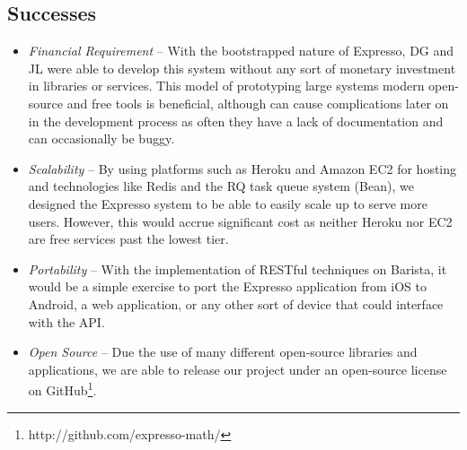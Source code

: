 \documentclass{acm_proc_article-sp}
\begin{document}
\subsection{Successes}
\begin{itemize}
	\item{\emph{Financial Requirement}} -- With the bootstrapped nature of Expresso, DG and JL were able to develop this system without any sort of monetary investment in libraries or services. This model of prototyping large systems modern open-source and free tools is beneficial, although can cause complications later on in the development process as often they have a lack of documentation and can occasionally be buggy.
	\item{\emph{Scalability}} -- By using platforms such as Heroku and Amazon EC2 for hosting and technologies like Redis and the RQ task queue system (Bean), we designed the Expresso system to be able to easily scale up to serve more users. However, this would accrue significant cost as neither Heroku nor EC2 are free services past the lowest tier.
	\item{\emph{Portability}} -- With the implementation of RESTful techniques on Barista, it would be a simple exercise to port the Expresso application from iOS to Android, a web application, or any other sort of device that could interface with the API.
	\item{\emph{Open Source}} -- Due the use of many different open-source libraries and applications, we are able to release our project under an open-source license on GitHub\footnote{http://github.com/expresso-math/}. 
\end{itemize}
\end{document}
